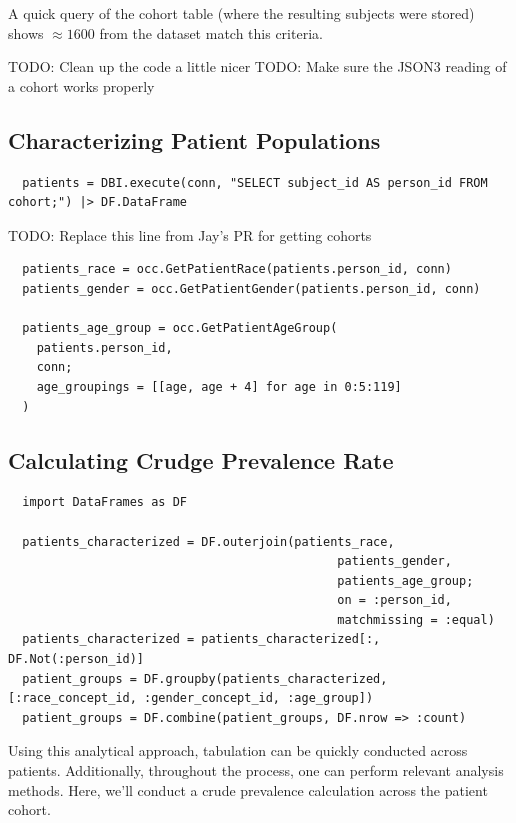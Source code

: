 \documentclass{juliacon}
\begin{document}
A quick query of the cohort table (where the resulting subjects were stored) shows $\approx 1600$ from the dataset match this criteria.

TODO: Clean up the code a little nicer
TODO: Make sure the JSON3 reading of a cohort works properly

\subsection{Characterizing Patient Populations}

\begin{verbatim}
  patients = DBI.execute(conn, "SELECT subject_id AS person_id FROM cohort;") |> DF.DataFrame
\end{verbatim}

TODO: Replace this line from Jay's PR for getting cohorts

\begin{verbatim}
  patients_race = occ.GetPatientRace(patients.person_id, conn)
  patients_gender = occ.GetPatientGender(patients.person_id, conn)

  patients_age_group = occ.GetPatientAgeGroup(
    patients.person_id, 
    conn; 
    age_groupings = [[age, age + 4] for age in 0:5:119]
  )
\end{verbatim}

\subsection{Calculating Crudge Prevalence Rate}

\begin{verbatim}
  import DataFrames as DF

  patients_characterized = DF.outerjoin(patients_race,
                                              patients_gender,
                                              patients_age_group;
                                              on = :person_id, 
                                              matchmissing = :equal)
  patients_characterized = patients_characterized[:, DF.Not(:person_id)]
  patient_groups = DF.groupby(patients_characterized, [:race_concept_id, :gender_concept_id, :age_group])
  patient_groups = DF.combine(patient_groups, DF.nrow => :count)
\end{verbatim}

Using this analytical approach, tabulation can be quickly conducted across patients.
Additionally, throughout the process, one can perform relevant analysis methods.
Here, we'll conduct a crude prevalence calculation across the patient cohort.
\end{document}

